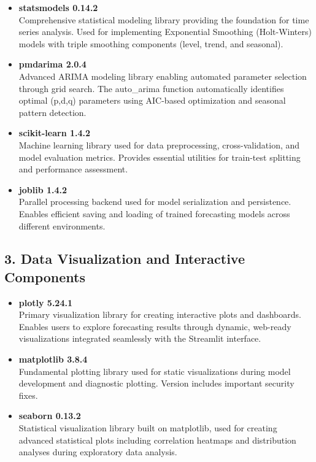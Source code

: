 \begin{itemize}
	\item \textbf{statsmodels 0.14.2} \\
	Comprehensive statistical modeling library providing the foundation for time series analysis. Used for implementing Exponential Smoothing (Holt-Winters) models with triple smoothing components (level, trend, and seasonal).
	
	\item \textbf{pmdarima 2.0.4} \\
	Advanced ARIMA modeling library enabling automated parameter selection through grid search. The auto\_arima function automatically identifies optimal (p,d,q) parameters using AIC-based optimization and seasonal pattern detection.
	
	\item \textbf{scikit-learn 1.4.2} \\
	Machine learning library used for data preprocessing, cross-validation, and model evaluation metrics. Provides essential utilities for train-test splitting and performance assessment.
	
	\item \textbf{joblib 1.4.2} \\
	Parallel processing backend used for model serialization and persistence. Enables efficient saving and loading of trained forecasting models across different environments.
\end{itemize}

\subsection*{3. Data Visualization and Interactive Components}

\begin{itemize}
	\item \textbf{plotly 5.24.1} \\
	Primary visualization library for creating interactive plots and dashboards. Enables users to explore forecasting results through dynamic, web-ready visualizations integrated seamlessly with the Streamlit interface.
	
	\item \textbf{matplotlib 3.8.4} \\
	Fundamental plotting library used for static visualizations during model development and diagnostic plotting. Version includes important security fixes.
	
	\item \textbf{seaborn 0.13.2} \\
	Statistical visualization library built on matplotlib, used for creating advanced statistical plots including correlation heatmaps and distribution analyses during exploratory data analysis.
\end{itemize}

